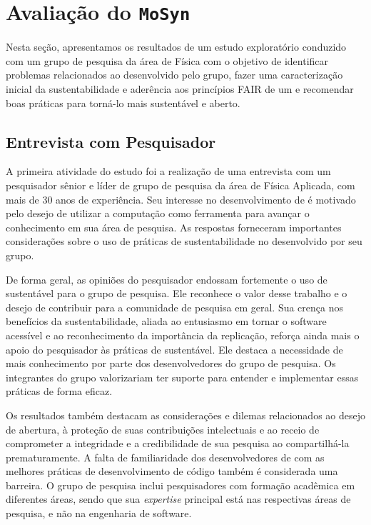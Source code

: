 \section{Avaliação do \RSw \texttt{MoSyn} }
\label{section:casesstudy:mosyn}

Nesta seção, apresentamos os resultados de um estudo exploratório conduzido com um grupo de pesquisa da área de Física com o objetivo de identificar problemas relacionados ao \RSw desenvolvido pelo grupo, fazer uma caracterização inicial da sustentabilidade 
e aderência aos princípios FAIR de um \RSw e recomendar boas práticas para torná-lo mais sustentável e aberto.

\subsection{Entrevista com Pesquisador}

A primeira atividade do estudo foi a realização de uma entrevista com um pesquisador sênior e líder de grupo de pesquisa da área de Física Aplicada, com mais de 30 anos de experiência. 
Seu interesse no desenvolvimento de \RSw é motivado pelo desejo de utilizar a computação como ferramenta para avançar o conhecimento em sua área de pesquisa.
As respostas forneceram importantes considerações sobre o uso de práticas de sustentabilidade no \RSw desenvolvido por seu grupo.

De forma geral, as opiniões do pesquisador endossam fortemente o uso de \RSw sustentável para o grupo de pesquisa. Ele reconhece o valor desse trabalho e o desejo de contribuir para a comunidade de pesquisa em geral.
Sua crença nos benefícios da sustentabilidade, aliada ao entusiasmo em tornar o software acessível e ao reconhecimento da importância da replicação, reforça ainda mais o apoio do pesquisador às práticas de \RSw sustentável.
Ele destaca a necessidade de mais conhecimento por parte dos desenvolvedores do grupo de pesquisa.
Os integrantes do grupo valorizariam ter suporte para entender e implementar essas práticas de forma eficaz. 

Os resultados também destacam as considerações e dilemas relacionados ao desejo de abertura, à proteção de suas contribuições intelectuais e ao receio de comprometer a integridade e a credibilidade de sua pesquisa ao compartilhá-la prematuramente.
A falta de familiaridade dos desenvolvedores de \RSw com as melhores práticas de desenvolvimento de código também é considerada uma barreira. 
O grupo de pesquisa inclui pesquisadores com formação acadêmica em diferentes áreas, 
sendo que sua \textit{expertise} principal está nas respectivas áreas de pesquisa, e não na engenharia de software.

